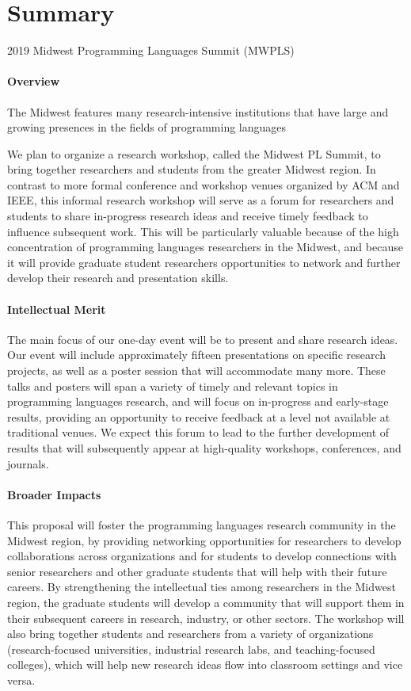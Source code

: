 \documentclass[11pt]{article}
\newcommand{\parahead}[1]{\paragraph{#1}}
\begin{document}
\section*{Summary} 

{\Large 2019 Midwest Programming Languages Summit (MWPLS)}

\parahead{Overview}

The Midwest features many research-intensive institutions that have large and growing presences in the fields of programming languages

We plan to organize a research workshop, called the Midwest PL Summit,
to bring together researchers and students from the greater Midwest
region. In contrast to more formal conference and workshop venues
organized by ACM and IEEE, this informal research workshop will serve
as a forum for researchers and students to share in-progress
research ideas and receive timely feedback to influence subsequent
work.
This will be particularly valuable
because of the high concentration of programming languages researchers
in the Midwest, and because it will provide graduate student
researchers opportunities to network and further develop their
research and presentation skills.

\vspace{8pt}

\parahead{Intellectual Merit}

The main focus of our one-day event will be to present and share
research ideas. Our event will include approximately fifteen
presentations on specific research projects, as well as a poster
session that will accommodate many more. These talks and posters will
span a variety of timely and relevant topics in programming languages
research, and will focus on in-progress and early-stage results, providing an opportunity to receive feedback at a level not available at traditional venues. We expect this forum to lead to the further development of results that will subsequently appear at high-quality workshops, conferences, and journals.

\vspace{8pt}

\parahead{Broader Impacts}

This proposal will foster the programming languages research community in
the Midwest region, by providing networking opportunities for
researchers to develop collaborations across organizations and for
students to develop connections with senior researchers and other
graduate students that will help with their future careers.
By strengthening
the intellectual ties among researchers in the Midwest region, the
graduate students will develop a community that will support them in
their subsequent careers in research, industry, or other sectors. The
workshop will also bring together students and researchers from a
variety of organizations (research-focused universities, industrial
research labs, and teaching-focused colleges), which will help new
research ideas flow into classroom settings and vice versa.
\end{document}
